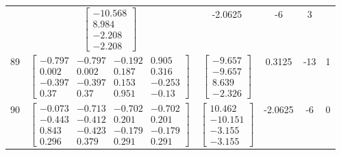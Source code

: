 \documentclass[a4paper,12pt]{article}
\begin{document}
\begin{tabular}{c c c c c c}
&
$\begin{bmatrix} -10.568 \\ 8.984 \\ -2.208 \\ -2.208 \end{bmatrix}$
&
-2.0625
&
-6
&
3
\\
89
&
$\begin{bmatrix} -0.797 & -0.797 & -0.192 & 0.905 \\ 0.002 & 0.002 & 0.187 & 0.316 \\ -0.397 & -0.397 & 0.153 & -0.253 \\ 0.37 & 0.37 & 0.951 & -0.13 \end{bmatrix}$
&
$\begin{bmatrix} -9.657 \\ -9.657 \\ 8.639 \\ -2.326 \end{bmatrix}$
&
0.3125
&
-13
&
1
\\
90
&
$\begin{bmatrix} -0.073 & -0.713 & -0.702 & -0.702 \\ -0.443 & -0.412 & 0.201 & 0.201 \\ 0.843 & -0.423 & -0.179 & -0.179 \\ 0.296 & 0.379 & 0.291 & 0.291 \end{bmatrix}$
&
$\begin{bmatrix} 10.462 \\ -10.151 \\ -3.155 \\ -3.155 \end{bmatrix}$
&
-2.0625
&
-6
&
0
\\
\end{tabular} \egroup \newpage
\end{document}
